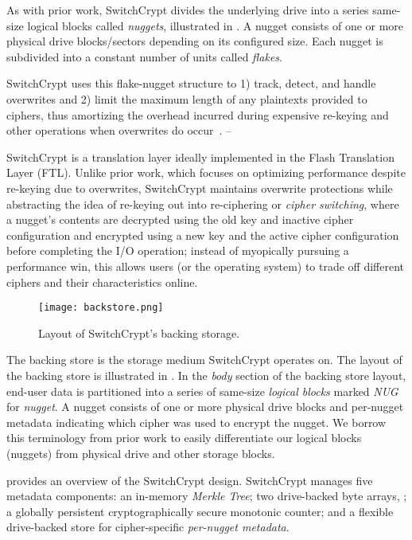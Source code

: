 As with prior work, SwitchCrypt divides the underlying drive into a series
same-size logical blocks called \emph{nuggets}, illustrated in .
A nugget consists of one or more physical drive blocks/sectors depending on its
configured size. Each nugget is subdivided into a constant number of units
called \emph{flakes}.

SwitchCrypt uses this flake-nugget structure to 1) track, detect, and handle
overwrites and 2) limit the maximum length of any plaintexts provided to
ciphers, thus amortizing the overhead incurred during expensive re-keying and
other operations when overwrites do occur~\cite{StrongBox}.
--

SwitchCrypt is a translation layer ideally implemented in the Flash Translation
Layer (FTL).  
Unlike prior work, which focuses on optimizing performance despite
re-keying due to overwrites, SwitchCrypt maintains overwrite protections while
abstracting the idea of re-keying out into re-ciphering or \emph{cipher
switching}, where a nugget's contents are decrypted using the old key and
inactive cipher configuration and encrypted using a new key and the active
cipher configuration before completing the I/O operation; instead of myopically
pursuing a performance win, this allows users (or the operating system) to trade off different ciphers and
their characteristics online.

\begin{figure}[t]
\centering
\texttt{[image: backstore.png]}
 \caption{Layout of SwitchCrypt's backing storage.}\label{fig:backstore2}
\end{figure}

The backing store is the storage medium SwitchCrypt operates on. The layout of the
backing store is illustrated in . In the \textit{body}
section of the backing store layout, end-user data is partitioned into a series
of same-size \emph{logical blocks} marked \textit{NUG} for \emph{nugget}. A
nugget consists of one or more physical drive blocks and per-nugget metadata
indicating which cipher was used to encrypt the nugget. We borrow this
terminology from prior work to easily differentiate our logical blocks (nuggets)
from physical drive and other storage blocks.

 provides an overview of the SwitchCrypt design. SwitchCrypt
manages five metadata components: an in-memory \emph{Merkle Tree}; two
drive-backed byte arrays, ; a globally persistent cryptographically secure
monotonic counter; and a flexible drive-backed store for cipher-specific
\emph{per-nugget metadata}.

